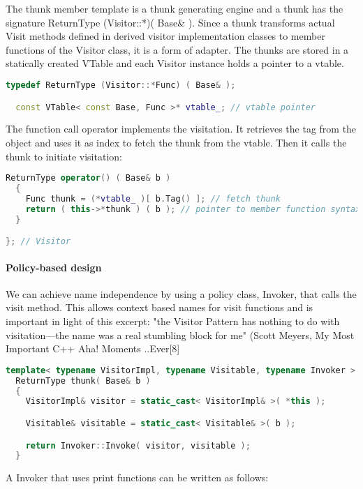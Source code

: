 \documentclass{book}
\begin{document}
The thunk member template is a thunk generating engine and a thunk has the signature ReturnType (Visitor::*)( Base\& ).
Since a thunk transforms actual Visit methods defined in derived visitor implementation classes to member functions of the Visitor class, it is a form of adapter.
The thunks are stored in a statically created VTable and each Visitor instance holds a pointer to a vtable.

\begin{lstlisting}[caption={visitor pattern sample code 5, commandexample.cpp},language=C++]
  typedef ReturnType (Visitor::*Func) ( Base& );

  const VTable< const Base, Func >* vtable_; // vtable pointer
\end{lstlisting}

The function call operator implements the visitation. It retrieves the tag from the object and uses it as index to fetch the thunk from the vtable. Then it calls the thunk to initiate visitation:

\begin{lstlisting}[caption={visitor pattern sample code 5, commandexample.cpp},language=C++]
  ReturnType operator() ( Base& b )
  {
    Func thunk = (*vtable_ )[ b.Tag() ]; // fetch thunk
    return ( this->*thunk ) ( b ); // pointer to member function syntax
  }

}; // Visitor
\end{lstlisting}

\paragraph{Policy-based design}

We can achieve name independence by using a policy class, Invoker, that calls the visit method.
This allows context based names for visit functions and is important in light of this excerpt:
"the Visitor Pattern has nothing to do with visitation—the name was a real stumbling block for me" (Scott Meyers, My Most Important C++ Aha! Moments ..Ever[8]

\begin{lstlisting}[caption={visitor pattern sample code 5, commandexample.cpp},language=C++]
  template< typename VisitorImpl, typename Visitable, typename Invoker >
  ReturnType thunk( Base& b )
  {
    VisitorImpl& visitor = static_cast< VisitorImpl& >( *this ); 

    Visitable& visitable = static_cast< Visitable& >( b );

    return Invoker::Invoke( visitor, visitable );
  }
\end{lstlisting}
A Invoker that uses print functions can be written as follows:
\end{document}
